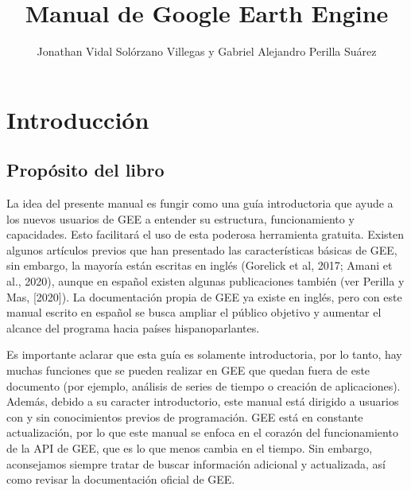 \documentclass[
  12pt,
  letterpaper,
  twoside]{book}
\title{Manual de Google Earth Engine}
\author{Jonathan Vidal Solórzano Villegas y Gabriel Alejandro Perilla Suárez}
\date{}
\renewcommand\headrulewidth{0pt}
\begin{document}
\maketitle

\renewcommand*\contentsname{Índice}
{
\hypersetup{linkcolor=black}
\setcounter{tocdepth}{1}
\tableofcontents
}
\setlength{\aweboxleftmargin}{0.1\linewidth}
\setlength{\aweboxcontentwidth}{0.85\linewidth}
\setlength{\aweboxvskip}{1mm}
\setlength{\aweboxrulewidth}{5pt}

\newpage
\mainmatter

\renewcommand\headrulewidth{1pt}
\pagestyle{fancy} 
  \fancyfoot{}
  \fancyfoot[LE,RO]{\thepage}
  \fancyhead{}
  \fancyhead[LE,RO]{\leftmark}
  \fancyhead[LO,RE]{\rightmark}

\hypertarget{introducciuxf3n}{%
\chapter{Introducción}\label{introducciuxf3n}}

\hypertarget{propuxf3sito-del-libro}{%
\section{Propósito del libro}\label{propuxf3sito-del-libro}}

La idea del presente manual es fungir como una guía introductoria que ayude a los nuevos usuarios de GEE a entender su estructura, funcionamiento y capacidades. Esto facilitará el uso de esta poderosa herramienta gratuita. Existen algunos artículos previos que han presentado las características básicas de GEE, sin embargo, la mayoría están escritas en inglés (Gorelick et al, 2017; Amani et al., 2020), aunque en español existen algunas publicaciones también (ver Perilla y Mas, {[}2020{]}). La documentación propia de GEE ya existe en inglés, pero con este manual escrito en español se busca ampliar el público objetivo y aumentar el alcance del programa hacia países hispanoparlantes.

Es importante aclarar que esta guía es solamente introductoria, por lo tanto, hay muchas funciones que se pueden realizar en GEE que quedan fuera de este documento (por ejemplo, análisis de series de tiempo o creación de aplicaciones). Además, debido a su caracter introductorio, este manual está dirigido a usuarios con y sin conocimientos previos de programación. GEE está en constante actualización, por lo que este manual se enfoca en el corazón del funcionamiento de la API de GEE, que es lo que menos cambia en el tiempo. Sin embargo, aconsejamos siempre tratar de buscar información adicional y actualizada, así como revisar la documentación oficial de GEE.
\end{document}
